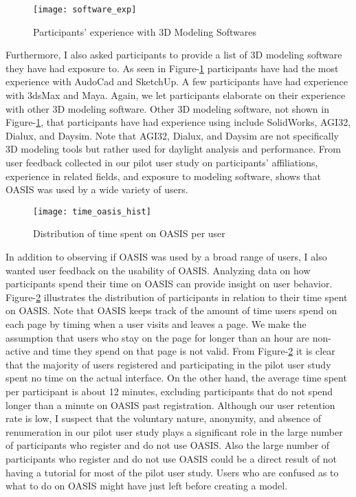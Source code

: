 \begin{figure}[!ht]
	\centering
	\texttt{[image: software\_exp]}
	\caption{Participants' experience with 3D Modeling Softwares}
	\label{fig:software_exp}
\end{figure}

Furthermore, I also asked participants to provide a list of 3D modeling software they have had exposure to.
As seen in Figure-\ref{fig:software_exp} participants have had the most experience with AudoCad\cite{todo} and SketchUp\cite{todo}. 
A few participants have had experience with 3dsMax\cite{todo} and Maya\cite{todo}.
Again, we let participants elaborate on their experience with other 3D modeling software. 
Other 3D modeling software, not shown in Figure-\ref{fig:software_exp}, that participants have had experience using include SolidWorks\cite{todo}, AGI32\cite{todo}, Dialux\cite{todo}, and Daysim\cite{todo}.
Note that AGI32, Dialux, and Daysim are not specifically 3D modeling tools but rather used for daylight analysis and performance.
From user feedback collected in our pilot user study on participants' affiliations, experience in related fields, and exposure to modeling software, shows that OASIS was used by a wide variety of users.

\begin{figure}[!ht]
	\centering
	\texttt{[image: time\_oasis\_hist]}
	\caption{Distribution of time spent on OASIS per user}
	\label{fig:time_oasis_hist}
\end{figure}

In addition to observing if OASIS was used by a broad range of users, I also wanted user feedback on the usability of OASIS.
Analyzing data on how participants spend their time  on OASIS can provide insight on user behavior.
Figure-\ref{fig:time_oasis_hist} illustrates the distribution of participants in relation to their time spent on OASIS.
Note that OASIS keeps track of the amount of time users spend on each page by timing when a user visits and leaves a page. We make the assumption that users who stay on the page for longer than an hour are non-active and time they spend on that page is not valid.
From Figure-\ref{fig:time_oasis_hist} it is clear that the majority of users registered and participating in the pilot user study spent no time on the actual interface.
On the other hand, the average time spent per participant is about 12 minutes, excluding participants that do not spend longer than a minute on OASIS past registration.
Although our user retention rate is low, I suspect that the voluntary nature, anonymity, and absence of renumeration in our pilot user study plays a significant role in the large number of participants who register and do not use OASIS.
Also  the large number of participants who register and do not use OASIS  could be a direct result of not having a tutorial for most of the pilot user study.
Users who are confused as to what to do on OASIS might have just left before creating a model.

